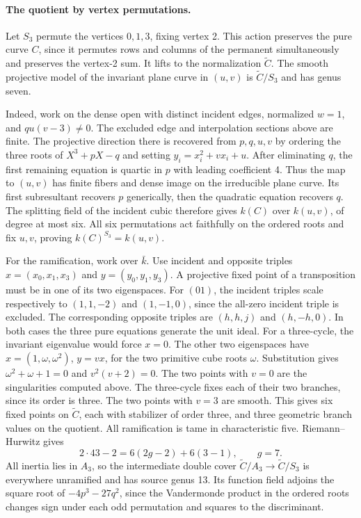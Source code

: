 \paragraph{The quotient by vertex permutations.}
Let \(S_3\) permute the vertices \(0,1,3\), fixing vertex 2. This action
preserves the pure curve \(C\), since it permutes rows and columns of
the permanent simultaneously and preserves the vertex-2 sum.
It lifts to the normalization \(\widetilde C\).
The smooth projective model of the invariant plane curve in \((u,v)\)
is \(\widetilde C/S_3\) and has genus seven.

Indeed, work on the dense open with distinct incident edges, normalized
\(w=1\), and \(qu(v-3)\ne0\). The excluded edge and interpolation
sections above are finite. The projective direction there is recovered
from \(p,q,u,v\) by ordering the three roots of \(X^3+pX-q\) and
setting \(y_i=x_i^2+vx_i+u\). After eliminating \(q\), the first
remaining equation is quartic in \(p\) with leading coefficient 4.
Thus the map to \((u,v)\) has finite fibers and dense image on the
irreducible plane curve. Its first subresultant recovers \(p\)
generically, then the quadratic equation recovers \(q\). The splitting
field of the incident cubic therefore gives \(k(C)\) over \(k(u,v)\),
of degree at most six. All six permutations act faithfully on the
ordered roots and fix \(u,v\), proving \(k(C)^{S_3}=k(u,v)\).

For the ramification, work over \(\bar k\). Use incident and opposite
triples \(x=(x_0,x_1,x_3)\) and \(y=(y_0,y_1,y_3)\). A projective
fixed point of a transposition must be in one of its two eigenspaces.
For \((01)\), the incident triples scale respectively to \((1,1,-2)\)
and \((1,-1,0)\), since the all-zero incident triple is excluded.
The corresponding opposite triples are \((h,h,j)\) and \((h,-h,0)\).
In both cases the three pure equations generate the unit ideal.
For a three-cycle, the invariant eigenvalue would force \(x=0\).
The other two eigenspaces have \(x=(1,\omega,\omega^2)\),
\(y=vx\), for the two primitive cube roots \(\omega\).
Substitution gives \(\omega^2+\omega+1=0\) and \(v^2(v+2)=0\).
The two points with \(v=0\) are the singularities computed above.
The three-cycle fixes each of their two branches, since its order is
three. The two points with \(v=3\) are smooth. This gives six fixed
points on \(\widetilde C\), each with stabilizer of order three, and
three geometric branch values on the quotient. All ramification is
tame in characteristic five. Riemann--Hurwitz \cite{stacksTameHurwitz} gives
\[
       2\cdot43-2=6(2g-2)+6(3-1),\qquad g=7.
\]
All inertia lies in \(A_3\), so the intermediate double cover
\(\widetilde C/A_3\to\widetilde C/S_3\) is everywhere unramified
and has source genus 13. Its function field adjoins the square root of
\(-4p^3-27q^2\), since the Vandermonde product in the ordered roots
changes sign under each odd permutation and squares to the discriminant.

